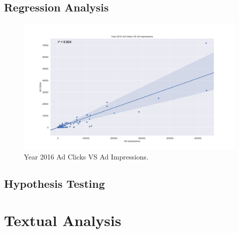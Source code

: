\documentclass[12pt]{article}
\theoremstyle{definition}
\begin{document}
\subsection*{\centering Regression Analysis}

\begin{figure}[H]
\centering
\includegraphics[width=\columnwidth]{./image/regression-plots/ad-clicks-vs-ad-impressions/year-2015-ad-clicks-vs-ad-impressions.png}
\caption*{Year 2016 Ad Clicks VS Ad Impressions.}
\end{figure}


\subsection*{\centering Hypothesis Testing}


\section*{\centering Textual Analysis}

\end{document}
